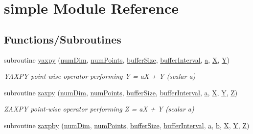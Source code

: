 \hypertarget{namespacesimple}{}\section{simple Module Reference}
\label{namespacesimple}
\subsection*{Functions/\+Subroutines}
\begin{DoxyCompactItemize}
\item 
subroutine \hyperlink{namespacesimple_a3875a3210180971c306698e973f5fc2e}{yaxpy} (\hyperlink{SATKernels_8H_a680185db8546de161968dabace9e94f1}{num\+Dim}, \hyperlink{ViscidKernels_8H_adf0bf75d0875d1bb42a5348bee7b7bfd}{num\+Points}, \hyperlink{SpecialKernels_8H_aa9426cdf16e85054db35e88f9b68c6be}{buffer\+Size}, \hyperlink{WENOKernels_8H_ad1001168d5432b52e6d0636f4dc0e60c}{buffer\+Interval}, \hyperlink{SimpleKernels_8H_a80f0b648bfd720a2277538fbad1d1eca}{a}, \hyperlink{SimpleKernels_8H_a1d2fc0c1bfd9fbd97521ac2a8082cd60}{X}, \hyperlink{SimpleKernels_8H_a4731ec58a5102a3b2d3116eaff33f108}{Y})
\begin{DoxyCompactList}\small\item\em Y\+A\+X\+PY point-\/wise operator performing Y = aX + Y (scalar a) \end{DoxyCompactList}\item 
subroutine \hyperlink{namespacesimple_a0f40a3b234ef053114049300e1e66c7f}{zaxpy} (\hyperlink{SATKernels_8H_a680185db8546de161968dabace9e94f1}{num\+Dim}, \hyperlink{ViscidKernels_8H_adf0bf75d0875d1bb42a5348bee7b7bfd}{num\+Points}, \hyperlink{SpecialKernels_8H_aa9426cdf16e85054db35e88f9b68c6be}{buffer\+Size}, \hyperlink{WENOKernels_8H_ad1001168d5432b52e6d0636f4dc0e60c}{buffer\+Interval}, \hyperlink{SimpleKernels_8H_a80f0b648bfd720a2277538fbad1d1eca}{a}, \hyperlink{SimpleKernels_8H_a1d2fc0c1bfd9fbd97521ac2a8082cd60}{X}, \hyperlink{SimpleKernels_8H_a4731ec58a5102a3b2d3116eaff33f108}{Y}, \hyperlink{SimpleKernels_8H_a410f84f11232fb55b68c2948b8caf50b}{Z})
\begin{DoxyCompactList}\small\item\em Z\+A\+X\+PY point-\/wise operator performing Z = aX + Y (scalar a) \end{DoxyCompactList}\item 
subroutine \hyperlink{namespacesimple_a1166b03634dccd63410ac5750fa1f8e0}{zaxpby} (\hyperlink{SATKernels_8H_a680185db8546de161968dabace9e94f1}{num\+Dim}, \hyperlink{ViscidKernels_8H_adf0bf75d0875d1bb42a5348bee7b7bfd}{num\+Points}, \hyperlink{SpecialKernels_8H_aa9426cdf16e85054db35e88f9b68c6be}{buffer\+Size}, \hyperlink{WENOKernels_8H_ad1001168d5432b52e6d0636f4dc0e60c}{buffer\+Interval}, \hyperlink{SimpleKernels_8H_a80f0b648bfd720a2277538fbad1d1eca}{a}, \hyperlink{SimpleKernels_8H_a65e9556c06854351eb006cb2a38d1aa8}{b}, \hyperlink{SimpleKernels_8H_a1d2fc0c1bfd9fbd97521ac2a8082cd60}{X}, \hyperlink{SimpleKernels_8H_a4731ec58a5102a3b2d3116eaff33f108}{Y}, \hyperlink{SimpleKernels_8H_a410f84f11232fb55b68c2948b8caf50b}{Z})

\end{DoxyCompactItemize}
